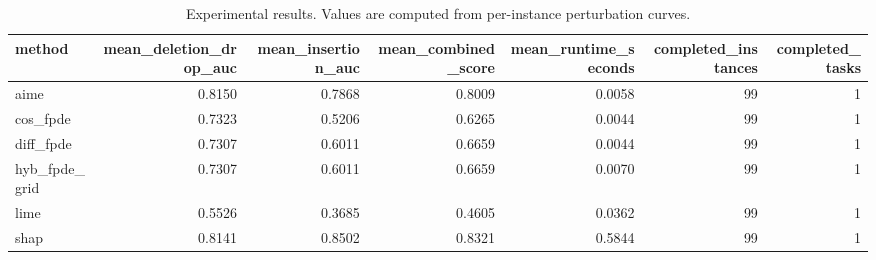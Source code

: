 \begin{table}[t]
\caption{Experimental results. Values are computed from per-instance perturbation curves.}
\label{tab:main_results_computed}
\centering
\begin{tabular}{lrrrrrr}
\toprule
method & mean\_deletion\_drop\_auc & mean\_insertion\_auc & mean\_combined\_score & mean\_runtime\_seconds & completed\_instances & completed\_tasks \\
\midrule
aime & 0.8150 & 0.7868 & 0.8009 & 0.0058 & 99 & 1 \\
cos\_fpde & 0.7323 & 0.5206 & 0.6265 & 0.0044 & 99 & 1 \\
diff\_fpde & 0.7307 & 0.6011 & 0.6659 & 0.0044 & 99 & 1 \\
hyb\_fpde\_grid & 0.7307 & 0.6011 & 0.6659 & 0.0070 & 99 & 1 \\
lime & 0.5526 & 0.3685 & 0.4605 & 0.0362 & 99 & 1 \\
shap & 0.8141 & 0.8502 & 0.8321 & 0.5844 & 99 & 1 \\
\bottomrule
\end{tabular}

\end{table}
